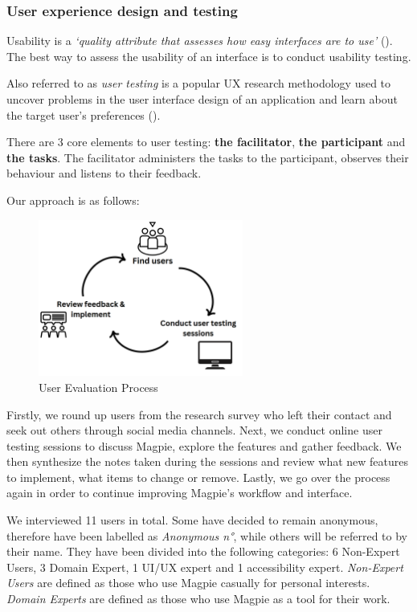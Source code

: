\subsubsection{User experience design and testing}
Usability is a \emph{`quality attribute that assesses how easy interfaces are to
use'} (\cite{usabilitycomponentsnielsen}). The best way to assess the usability
of an interface is to conduct usability testing.

Also referred to as \emph{user testing} is a popular UX research methodology
used to uncover problems in the user interface design of an application and
learn about the target user's preferences (\cite{usertestingdefinition}).

\noindent There are 3 core elements to user testing: \textbf{the facilitator},
\textbf{the participant} and \textbf{the tasks}. The facilitator administers the
tasks to the participant, observes their behaviour and listens to their
feedback.

\noindent Our approach is as follows:
\begin{figure}[h!]
    \centering
    \includegraphics[width=0.6\textwidth]{images/user-eval-process.png}
    \caption{User Evaluation Process}
\end{figure}

Firstly, we round up users from the research survey who left their contact and
seek out others through social media channels. Next, we conduct online user
testing sessions to discuss Magpie, explore the features and gather feedback. We
then synthesize the notes taken during the sessions and review what new features
to implement, what items to change or remove. Lastly, we go over the process
again in order to continue improving Magpie's workflow and interface.

We interviewed 11 users in total. Some have decided to remain anonymous,
therefore have been labelled as \emph{Anonymous n°}, while others will be
referred to by their name. They have been divided into the following categories:
6 Non-Expert Users, 3 Domain Expert, 1 UI/UX expert and 1 accessibility expert.
\emph{Non-Expert Users} are defined as those who use Magpie casually for personal
interests. \emph{Domain Experts} are defined as those who use Magpie as a tool
for their work.

